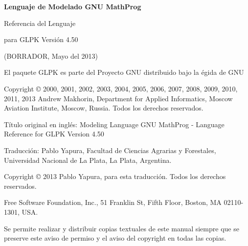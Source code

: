 \documentclass[11pt,spanish]{report}
\begin{document}
\thispagestyle{empty}

\begin{center}

\vspace*{1.5in}

\begin{huge}
\sf\bfseries Lenguaje de Modelado GNU MathProg
\end{huge}

\vspace{0.5in}

\begin{LARGE}
\sf Referencia del Lenguaje
\end{LARGE}

\vspace{0.5in}

\begin{LARGE}
\sf para GLPK Versión 4.50
\end{LARGE}

\vspace{0.5in}
\begin{Large}
\sf (BORRADOR, Mayo del 2013)
\end{Large}

\end{center}

\newpage

\vspace*{1in}

\vfill

\noindent
El paquete GLPK es parte del Proyecto GNU distribuido bajo la égida de GNU

\noindent
Copyright \copyright{} 2000, 2001, 2002, 2003, 2004, 2005, 2006, 2007,
2008, 2009, 2010, 2011, 2013 Andrew Makhorin, Department for Applied
Informatics, Moscow Aviation Institute, Moscow, Russia. Todos los derechos
reservados.

\noindent
Título original en inglés: Modeling Language GNU MathProg - Language Reference for GLPK Version 4.50

\noindent
Traducción: Pablo Yapura, Facultad de Ciencias Agrarias y Forestales, Universidad Nacional de La Plata, La Plata, Argentina.

\noindent
Copyright \copyright{} 2013 Pablo Yapura, para esta traducción. Todos los derechos reservados.

\noindent
Free Software Foundation, Inc., 51 Franklin St, Fifth Floor, Boston,
MA 02110-1301, USA.

\noindent
Se permite realizar y distribuir copias textuales de este manual siempre que se preserve este aviso de permiso y el aviso del copyright en todas las copias.
\end{document}
